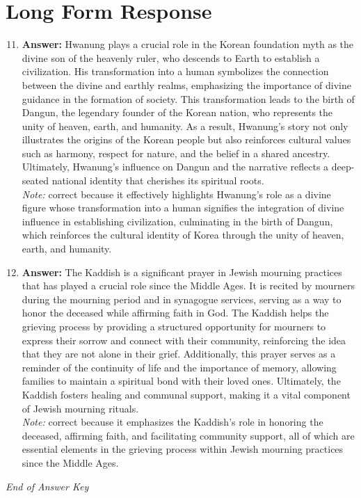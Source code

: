 \documentclass[12pt]{article}
\begin{document}
\section*{Long Form Response}
\begin{enumerate}[label=\arabic*.]
\setcounter{enumi}{10}
\item \textbf{Answer:} Hwanung plays a crucial role in the Korean foundation myth as the divine son of the heavenly ruler, who descends to Earth to establish a civilization. His transformation into a human symbolizes the connection between the divine and earthly realms, emphasizing the importance of divine guidance in the formation of society. This transformation leads to the birth of Dangun, the legendary founder of the Korean nation, who represents the unity of heaven, earth, and humanity. As a result, Hwanung's story not only illustrates the origins of the Korean people but also reinforces cultural values such as harmony, respect for nature, and the belief in a shared ancestry. Ultimately, Hwanung's influence on Dangun and the narrative reflects a deep-seated national identity that cherishes its spiritual roots.
\\ \textit{Note:} correct because it effectively highlights Hwanung's role as a divine figure whose transformation into a human signifies the integration of divine influence in establishing civilization, culminating in the birth of Dangun, which reinforces the cultural identity of Korea through the unity of heaven, earth, and humanity.
\item \textbf{Answer:} The Kaddish is a significant prayer in Jewish mourning practices that has played a crucial role since the Middle Ages. It is recited by mourners during the mourning period and in synagogue services, serving as a way to honor the deceased while affirming faith in God. The Kaddish helps the grieving process by providing a structured opportunity for mourners to express their sorrow and connect with their community, reinforcing the idea that they are not alone in their grief. Additionally, this prayer serves as a reminder of the continuity of life and the importance of memory, allowing families to maintain a spiritual bond with their loved ones. Ultimately, the Kaddish fosters healing and communal support, making it a vital component of Jewish mourning rituals.
\\ \textit{Note:} correct because it emphasizes the Kaddish's role in honoring the deceased, affirming faith, and facilitating community support, all of which are essential elements in the grieving process within Jewish mourning practices since the Middle Ages.
\end{enumerate}

\vfill
\noindent\textit{End of Answer Key}
\end{document}
